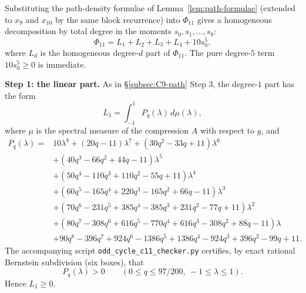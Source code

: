 \documentclass[11pt]{article}
\begin{document}
Substituting the path-density formulae of Lemma~\ref{lem:path-formulae} (extended to $x_9$ and $x_{10}$ by the same block recurrence) into $\Phi_{11}$ gives a homogeneous decomposition by total degree in the moments $s_0,s_1,\ldots,s_8$:
\begin{equation}\label{eq:Phi11-decomp}
        \Phi_{11}=L_1+L_2+L_3+L_4+10s_0^5,
\end{equation}
where $L_d$ is the homogeneous degree-$d$ part of $\Phi_{11}$.  The pure degree-$5$ term $10s_0^5\ge0$ is immediate.

\medskip\noindent\textbf{Step 1: the linear part.}
As in \S\ref{subsec:C9-path} Step 3, the degree-$1$ part has the form
\[
        L_1=\int_{-1}^{1}P_q(\lambda)\,d\mu(\lambda),
\]
where $\mu$ is the spectral measure of the compression $A$ with respect to $g$, and
\begin{equation}\label{eq:Pq-C11}
\begin{aligned}
P_q(\lambda)={}&10\lambda^8+(20q-11)\lambda^7+(30q^2-33q+11)\lambda^6 \\
&+(40q^3-66q^2+44q-11)\lambda^5 \\
&+(50q^4-110q^3+110q^2-55q+11)\lambda^4 \\
&+(60q^5-165q^4+220q^3-165q^2+66q-11)\lambda^3 \\
&+(70q^6-231q^5+385q^4-385q^3+231q^2-77q+11)\lambda^2 \\
&+(80q^7-308q^6+616q^5-770q^4+616q^3-308q^2+88q-11)\lambda \\
&+90q^8-396q^7+924q^6-1386q^5+1386q^4-924q^3+396q^2-99q+11.
\end{aligned}
\end{equation}
The accompanying script \texttt{odd\_cycle\_c11\_checker.py} certifies, by exact rational Bernstein subdivision (six boxes), that
\begin{equation}\label{eq:Pq-positive}
        P_q(\lambda)>0
        \qquad
        (0\le q\le 97/200,\ -1\le\lambda\le1).
\end{equation}
Hence $L_1\ge0$.
\end{document}
